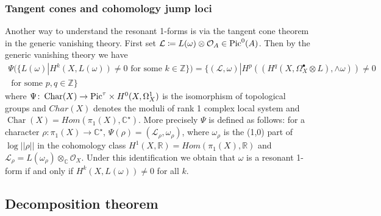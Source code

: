 \documentclass[11pt,reqno]{amsart}
\theoremstyle{definition}
\theoremstyle{remark}
\theoremstyle{cited}
\theoremstyle{citeddef}
\DeclareMathOperator{\Char}{Char}
\def\Pic{{\rm Pic}}
\newcommand{\sL}{\mathcal{L}}
\newcommand{\sM}{\mathcal{M}}
\newcommand{\sO}{\mathcal{O}}
\newcommand{\sR}{\mathcal{R}}
\newcommand{\bbC}{\mathbb{C}}
\newcommand{\bbR}{\mathbb{R}}
\newcommand{\bbZ}{\mathbb{Z}}
\begin{document}
\subsubsection{Tangent cones and cohomology jump loci}
\label{sub:tc} Another way to understand the resonant 1-forms is via the tangent cone theorem in the
generic vanishing theory. 
First set $\sL \coloneqq L(\omega)\otimes \sO_A \in \Pic^0(A)$. 
Then by the generic vanishing theory \cite[Theorem 3]{Ara} we have 
\begin{equation}\begin{split}
\Psi(\{L(\omega)| H^k(X, L(\omega))\neq 0 \text{ for some } k\in \bbZ\})
=\{(\sL,\omega)| H^p((H^q(X,\Omega_X^{\bullet}\otimes L),\wedge\omega)) \neq 0
\\ \text{ for some } p,q\in\bbZ\}
\end{split}\label{eq:}
\end{equation}
where $\Psi \colon\Char(X) \to \Pic^{\tau}\times H^0(X,\Omega_X^1)$ 
is the isomorphism of topological groups and $Char(X)$ denotes the moduli
of rank 1 complex local system and $\Char(X) = Hom(\pi_1(X),\bbC^{\star})$. More precisely $\Psi$ is defined
as follows: for a character $\rho\colon \pi_1(X)\to \bbC^{\star}$, $\Psi(\rho) = (\sL_{\rho} , \omega_{\rho})$, where 
$\omega_\rho$ is the (1,0) part of $\log ||\rho||$ in the cohomology class $H^1(X, \bbR) = Hom(\pi_1(X), \bbR)$ and
$\sL_{\rho} = L(\omega_{\rho})\otimes_{\bbC}\sO_X$.
Under this identification we obtain that $\omega$ is a resonant 1-form if and only if $H^k(X, L(\omega))\neq 0$ for all $k$. 


\subsection{Decomposition theorem}
\end{document}
